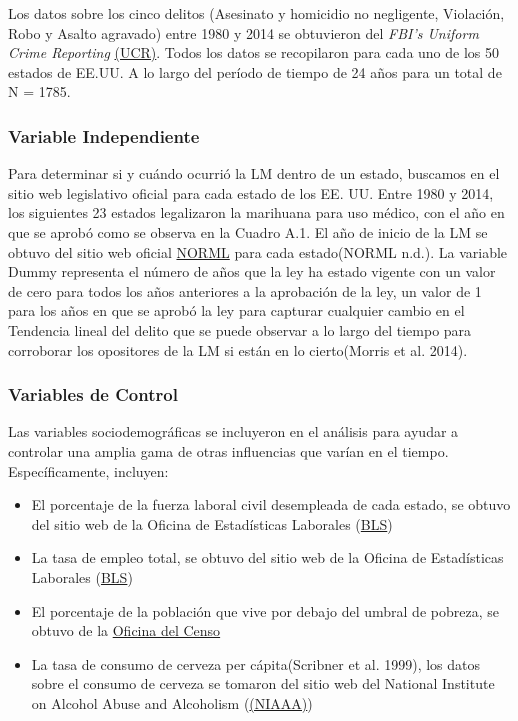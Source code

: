 \documentclass[11pt,]{article}
\providecommand{\tightlist}{%
\setlength{\itemsep}{0pt}\setlength{\parskip}{0pt}}
\begin{document}
Los datos sobre los cinco delitos (Asesinato y homicidio no negligente,
Violación, Robo y Asalto agravado) entre 1980 y 2014 se obtuvieron del
\emph{FBI's Uniform Crime Reporting} \href{https://bjs.gov/}{(UCR)}.
Todos los datos se recopilaron para cada uno de los 50 estados de EE.UU.
A lo largo del período de tiempo de 24 años para un total de N = 1785.

\hypertarget{variable-independiente}{%
\subsubsection{Variable Independiente}\label{variable-independiente}}

Para determinar si y cuándo ocurrió la LM dentro de un estado, buscamos
en el sitio web legislativo oficial para cada estado de los EE. UU.
Entre 1980 y 2014, los siguientes 23 estados legalizaron la marihuana
para uso médico, con el año en que se aprobó como se observa en la
Cuadro A.1. El año de inicio de la LM se obtuvo del sitio web oficial
\href{https://norml.org/states}{NORML} para cada estado(NORML n.d.). La
variable Dummy representa el número de años que la ley ha estado vigente
con un valor de cero para todos los años anteriores a la aprobación de
la ley, un valor de 1 para los años en que se aprobó la ley para
capturar cualquier cambio en el Tendencia lineal del delito que se puede
observar a lo largo del tiempo para corroborar los opositores de la LM
si están en lo cierto(Morris et al. 2014).

\hypertarget{variables-de-control}{%
\subsubsection{Variables de Control}\label{variables-de-control}}

Las variables sociodemográficas se incluyeron en el análisis para ayudar
a controlar una amplia gama de otras influencias que varían en el
tiempo. Específicamente, incluyen:

\begin{itemize}
\tightlist
\item
  El porcentaje de la fuerza laboral civil desempleada de cada estado,
  se obtuvo del sitio web de la Oficina de Estadísticas Laborales
  (\href{https://www.bls.gov/lau/}{BLS})
\item
  La tasa de empleo total, se obtuvo del sitio web de la Oficina de
  Estadísticas Laborales (\href{https://www.bls.gov/sae/}{BLS})
\item
  El porcentaje de la población que vive por debajo del umbral de
  pobreza, se obtuvo de la
  \href{https://www.census.gov/topics/income-poverty/poverty.html}{Oficina
  del Censo}
\item
  La tasa de consumo de cerveza per cápita(Scribner et al. 1999), los
  datos sobre el consumo de cerveza se tomaron del sitio web del
  National Institute on Alcohol Abuse and Alcoholism
  (\href{https://pubs.niaaa.nih.gov/publications/surveillance110/CONS16.htm}{(NIAAA)})
\end{itemize}
\end{document}

